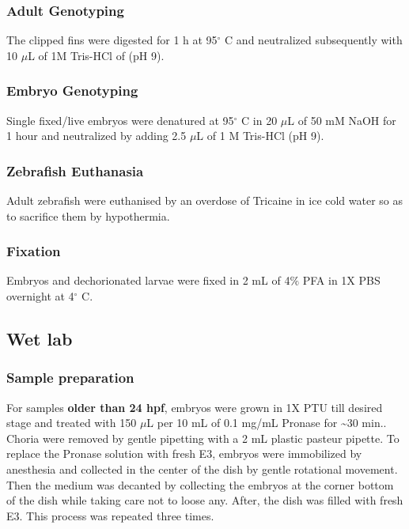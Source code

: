 \documentclass[10pt, b5paper, singlespacinge, twoside]{reedthesis} %
\theoremstyle{definition}
\theoremstyle{definition}
\theoremstyle{definition}
\theoremstyle{remark}
\begin{document}
\hypertarget{adult-genotyping}{%
\subsubsection{Adult Genotyping}\label{adult-genotyping}}

The clipped fins were digested for 1 h at 95\(^\circ\) C and neutralized subsequently with 10 \(\mu\)L of 1M Tris-HCl of (pH 9).

\hypertarget{embryo-genotyping}{%
\subsubsection{Embryo Genotyping}\label{embryo-genotyping}}

Single fixed/live embryos were denatured at 95\(^\circ\) C in 20 \(\mu\)L of 50 mM NaOH for 1 hour and neutralized by adding 2.5 \(\mu\)L of 1 M Tris-HCl (pH 9).

\hypertarget{zebrafish-euthanasia}{%
\subsubsection{Zebrafish Euthanasia}\label{zebrafish-euthanasia}}

Adult zebrafish were euthanised by an overdose of Tricaine in ice cold water so as to sacrifice them by hypothermia.

\hypertarget{fixation}{%
\subsubsection{Fixation}\label{fixation}}

Embryos and dechorionated larvae were fixed in 2 mL of 4\(\%\) PFA in 1X PBS overnight at 4\(^\circ\) C.

\hypertarget{Wet-met}{%
\subsection{Wet lab}\label{Wet-met}}

\hypertarget{sampleprep}{%
\subsubsection{Sample preparation}\label{sampleprep}}

For samples \textbf{older than 24 hpf}, embryos were grown in 1X PTU till desired stage and treated with 150 \(\mu\)L per 10 mL of 0.1 mg/mL Pronase for \textasciitilde30 min.. Choria were removed by gentle pipetting with a 2 mL plastic pasteur pipette. To replace the Pronase solution with fresh E3, embryos were immobilized by anesthesia and collected in the center of the dish by gentle rotational movement. Then the medium was decanted by collecting the embryos at the corner bottom of the dish while taking care not to loose any. After, the dish was filled with fresh E3. This process was repeated three times.
\end{document}

